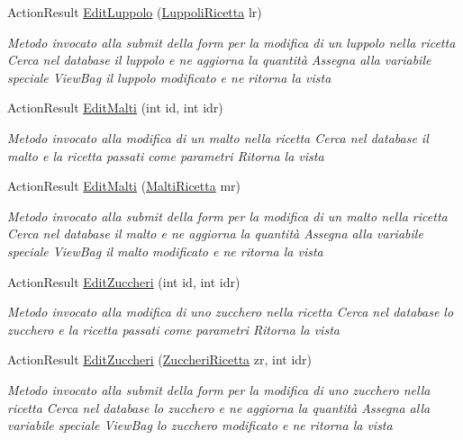 \begin{DoxyCompactItemize}
Action\+Result \mbox{\hyperlink{class_brew_day2_1_1_controllers_1_1_ricette_controller_afdf4aef3b3e01666deef967a7c4353c8}{Edit\+Luppolo}} (\mbox{\hyperlink{class_brew_day2_1_1_models_1_1_luppoli_ricetta}{Luppoli\+Ricetta}} lr)
\begin{DoxyCompactList}\small\item\em Metodo invocato alla submit della form per la modifica di un luppolo nella ricetta Cerca nel database il luppolo e ne aggiorna la quantità Assegna alla variabile speciale View\+Bag il luppolo modificato e ne ritorna la vista \end{DoxyCompactList}\item 
Action\+Result \mbox{\hyperlink{class_brew_day2_1_1_controllers_1_1_ricette_controller_aca875a01813208cd08ebf7d5b18115c7}{Edit\+Malti}} (int id, int idr)
\begin{DoxyCompactList}\small\item\em Metodo invocato alla modifica di un malto nella ricetta Cerca nel database il malto e la ricetta passati come parametri Ritorna la vista \end{DoxyCompactList}\item 
Action\+Result \mbox{\hyperlink{class_brew_day2_1_1_controllers_1_1_ricette_controller_a38cdcb5cefa1ee88dc5206abad03b56f}{Edit\+Malti}} (\mbox{\hyperlink{class_brew_day2_1_1_models_1_1_malti_ricetta}{Malti\+Ricetta}} mr)
\begin{DoxyCompactList}\small\item\em Metodo invocato alla submit della form per la modifica di un malto nella ricetta Cerca nel database il malto e ne aggiorna la quantità Assegna alla variabile speciale View\+Bag il malto modificato e ne ritorna la vista \end{DoxyCompactList}\item 
Action\+Result \mbox{\hyperlink{class_brew_day2_1_1_controllers_1_1_ricette_controller_a8adb86316015ba2a434a626226c86143}{Edit\+Zuccheri}} (int id, int idr)
\begin{DoxyCompactList}\small\item\em Metodo invocato alla modifica di uno zucchero nella ricetta Cerca nel database lo zucchero e la ricetta passati come parametri Ritorna la vista \end{DoxyCompactList}\item 
Action\+Result \mbox{\hyperlink{class_brew_day2_1_1_controllers_1_1_ricette_controller_a112bb278fc4c6fde7448fd99f9b9a114}{Edit\+Zuccheri}} (\mbox{\hyperlink{class_brew_day2_1_1_models_1_1_zuccheri_ricetta}{Zuccheri\+Ricetta}} zr, int idr)
\begin{DoxyCompactList}\small\item\em Metodo invocato alla submit della form per la modifica di uno zucchero nella ricetta Cerca nel database lo zucchero e ne aggiorna la quantità Assegna alla variabile speciale View\+Bag lo zucchero modificato e ne ritorna la vista \end{DoxyCompactList}\end{DoxyCompactItemize}
